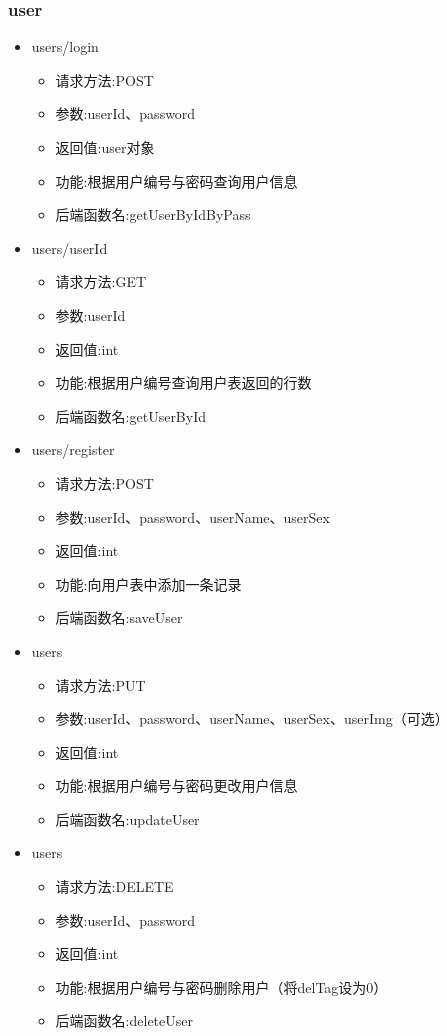 \subsubsection*{user}
\begin{itemize}
\item users/login
\begin{itemize}
    \item 请求方法:POST
    \item 参数:userId、password
    \item 返回值:user对象
    \item 功能:根据用户编号与密码查询用户信息
    \item 后端函数名:getUserByIdByPass
\end{itemize}

\item users/{userId}
\begin{itemize}
    \item 请求方法:GET
    \item 参数:userId
    \item 返回值:int
    \item 功能:根据用户编号查询用户表返回的行数
    \item 后端函数名:getUserById
\end{itemize}

\item users/register
\begin{itemize}
    \item 请求方法:POST
    \item 参数:userId、password、userName、userSex
    \item 返回值:int
    \item 功能:向用户表中添加一条记录
    \item 后端函数名:saveUser
\end{itemize}

\item users
\begin{itemize}
    \item 请求方法:PUT
    \item 参数:userId、password、userName、userSex、userImg（可选）
    \item 返回值:int
    \item 功能:根据用户编号与密码更改用户信息
    \item 后端函数名:updateUser
\end{itemize}

\item users
\begin{itemize}
    \item 请求方法:DELETE
    \item 参数:userId、password
    \item 返回值:int
    \item 功能:根据用户编号与密码删除用户（将delTag设为0）
    \item 后端函数名:deleteUser
\end{itemize}
\end{itemize}
